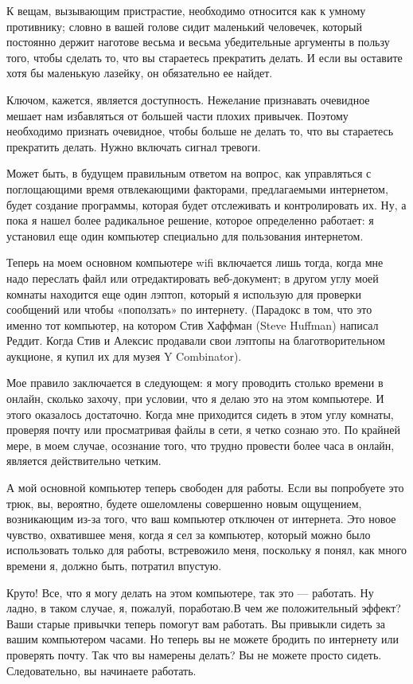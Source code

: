 \documentclass[ebook,12pt,oneside,openany]{memoir}
\begin{document}
К вещам, вызывающим пристрастие, необходимо относится как к умному
противнику; словно в вашей голове сидит маленький человечек, который
постоянно держит наготове весьма и весьма убедительные аргументы в
пользу того, чтобы сделать то, что вы стараетесь прекратить делать. И
если вы оставите хотя бы маленькую лазейку, он обязательно ее найдет.

Ключом, кажется, является доступность. Нежелание признавать очевидное
мешает нам избавляться от большей части плохих привычек. Поэтому
необходимо признать очевидное, чтобы больше не делать то, что вы
стараетесь прекратить делать. Нужно включать сигнал тревоги.

Может быть, в будущем правильным ответом на вопрос, как управляться с
поглощающими время отвлекающими факторами, предлагаемыми интернетом,
будет создание программы, которая будет отслеживать и контролировать
их. Ну, а пока я нашел более радикальное решение, которое определенно
работает: я установил еще один компьютер специально для пользования
интернетом.

Теперь на моем основном компьютере wifi включается лишь тогда, когда
мне надо переслать файл или отредактировать веб-документ; в другом
углу моей комнаты находится еще один лэптоп, который я использую для
проверки сообщений или чтобы «поползать» по интернету. (Парадокс в
том, что это именно тот компьютер, на котором Стив Хаффман (Steve
Huffman) написал Реддит. Когда Стив и Алексис продавали свои лэптопы
на благотворительном аукционе, я купил их для музея Y Combinator).

Мое правило заключается в следующем: я могу проводить столько времени
в онлайн, сколько захочу, при условии, что я делаю это на этом
компьютере. И этого оказалось достаточно. Когда мне приходится сидеть
в этом углу комнаты, проверяя почту или просматривая файлы в сети, я
четко сознаю это. По крайней мере, в моем случае, осознание того, что
трудно провести более часа в онлайн, является действительно четким.

А мой основной компьютер теперь свободен для работы. Если вы
попробуете это трюк, вы, вероятно, будете ошеломлены совершенно новым
ощущением, возникающим из-за того, что ваш компьютер отключен от
интернета. Это новое чувство, охватившее меня, когда я сел за
компьютер, который можно было использовать только для работы,
встревожило меня, поскольку я понял, как много времени я, должно быть,
потратил впустую.

Круто! Все, что я могу делать на этом компьютере, так это — работать.
Ну ладно, в таком случае, я, пожалуй, поработаю.В чем же положительный
эффект? Ваши старые привычки теперь помогут вам работать. Вы привыкли
сидеть за вашим компьютером часами. Но теперь вы не можете бродить по
интернету или проверять почту. Так что вы намерены делать? Вы не
можете просто сидеть. Следовательно, вы начинаете работать.
\end{document}
